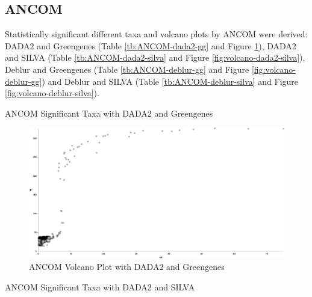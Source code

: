 \documentclass[a4paper]{article}
\begin{document}
        \subsection{ANCOM}
            Statistically significant different taxa and volcano plots by ANCOM were derived: DADA2 and Greengenes (Table \ref{tb:ANCOM-dada2-gg} and Figure \ref{fig:volcano-dada2-gg}), DADA2 and SILVA (Table \ref{tb:ANCOM-dada2-silva} and Figure \ref{fig:volcano-dada2-silva}), Deblur and Greengenes (Table \ref{tb:ANCOM-deblur-gg} and Figure \ref{fig:volcano-deblur-gg}) and Deblur and SILVA (Table \ref{tb:ANCOM-deblur-silva} and Figure \ref{fig:volcano-deblur-silva}).

            \begin{table}[p]
                \centering
                \caption{ANCOM Significant Taxa with DADA2 and Greengenes}
                \label{tb:ANCOM-dada2-gg}

            \end{table}

            \begin{figure}[p]
                \centering
                \includegraphics[width=0.8 \linewidth]{figures/ANCOM/DADA2.gg.png}
                \caption{ANCOM Volcano Plot with DADA2 and Greengenes}
                \label{fig:volcano-dada2-gg}
            \end{figure}

            \begin{table}[p]
                \centering
                \caption{ANCOM Significant Taxa with DADA2 and SILVA}
                \label{tb:ANCOM-dada2-silva}

            \end{table}
\end{document}
